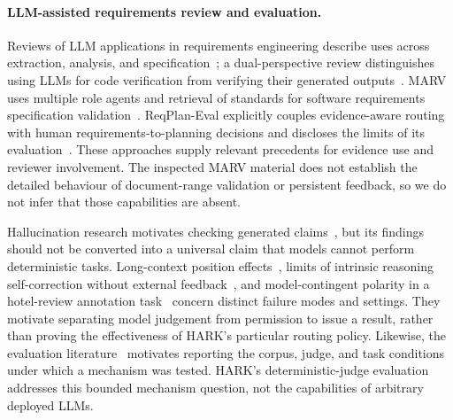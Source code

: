 \paragraph{LLM-assisted requirements review and evaluation.}
Reviews of LLM applications in requirements engineering describe uses across extraction, analysis, and specification~\cite{hemmat2025}; a dual-perspective review distinguishes using LLMs for code verification from verifying their generated outputs~\cite{dolcetti2025}. MARV uses multiple role agents and retrieval of standards for software requirements specification validation~\cite{chinnam2025}. ReqPlan-Eval explicitly couples evidence-aware routing with human requirements-to-planning decisions and discloses the limits of its evaluation~\cite{alsawalqah2026}. These approaches supply relevant precedents for evidence use and reviewer involvement. The inspected MARV material does not establish the detailed behaviour of document-range validation or persistent feedback, so we do not infer that those capabilities are absent.

Hallucination research motivates checking generated claims~\cite{huang2025hall}, but its findings should not be converted into a universal claim that models cannot perform deterministic tasks. Long-context position effects~\cite{liu2024lost}, limits of intrinsic reasoning self-correction without external feedback~\cite{huang2024self}, and model-contingent polarity in a hotel-review annotation task~\cite{polarity2026} concern distinct failure modes and settings. They motivate separating model judgement from permission to issue a result, rather than proving the effectiveness of HARK's particular routing policy. Likewise, the evaluation literature~\cite{chang2024eval} motivates reporting the corpus, judge, and task conditions under which a mechanism was tested. HARK's deterministic-judge evaluation addresses this bounded mechanism question, not the capabilities of arbitrary deployed LLMs.

